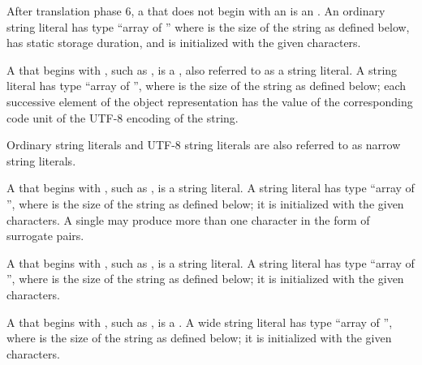 \pnum
{}%
%
After translation phase 6, a 
that does not begin with an  is an
.
An ordinary string literal
has type ``array of  ''
where  is the size of the string as defined below,
has static storage duration, and
is initialized with the given characters.

\pnum
{}%
A  that begins with ,
%
such as , is a ,
also referred to as a  string literal.
A  string literal
has type ``array of  '',
where  is the size of the string as defined below;
each successive element of the object representation has
the value of the corresponding code unit of the UTF-8 encoding of the string.

\pnum
Ordinary string literals and UTF-8 string literals are
also referred to as narrow string literals.

\pnum
{}%
%
A  that begins with ,
%
such as , is
a  string literal. A  string literal has
type ``array of  '', where  is the
size of the string as defined below; it
is initialized with the given characters. A single  may
produce more than one  character in the form of
surrogate pairs.

\pnum
{}%
%
A  that begins with ,
%
such as , is
a  string literal. A  string literal has
type ``array of  '', where  is the
size of the string as defined below; it
is initialized with the given characters.

\pnum
{}%
A  that begins with ,
%
such as , is a .
%
%
%
%
A wide string literal has type ``array of  '', where  is the size of the string as defined below; it
is initialized with the given characters.


